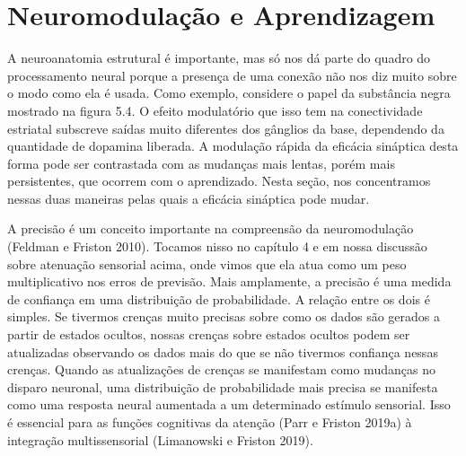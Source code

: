 \documentclass[
  12pt,
]{book}
\begin{document}
\hypertarget{neuromodulauxe7uxe3o-e-aprendizagem}{%
\section{Neuromodulação e Aprendizagem}\label{neuromodulauxe7uxe3o-e-aprendizagem}}

A neuroanatomia estrutural é importante, mas só nos dá parte do quadro do processamento neural porque a presença de uma conexão não nos diz muito sobre o modo como ela é usada. Como exemplo, considere o papel da substância negra mostrado na figura 5.4. O efeito modulatório que isso tem na conectividade estriatal subscreve saídas muito diferentes dos gânglios da base, dependendo da quantidade de dopamina liberada. A modulação rápida da eficácia sináptica desta forma pode ser contrastada com as mudanças mais lentas, porém mais persistentes, que ocorrem com o aprendizado. Nesta seção, nos concentramos nessas duas maneiras pelas quais a eficácia sináptica pode mudar.

A precisão é um conceito importante na compreensão da neuromodulação (Feldman e Friston 2010). Tocamos nisso no capítulo 4 e em nossa discussão sobre atenuação sensorial acima, onde vimos que ela atua como um peso multiplicativo nos erros de previsão. Mais amplamente, a precisão é uma medida de confiança em uma distribuição de probabilidade. A relação entre os dois é simples. Se tivermos crenças muito precisas sobre como os dados são gerados a partir de estados ocultos, nossas crenças sobre estados ocultos podem ser atualizadas observando os dados mais do que se não tivermos confiança nessas crenças. Quando as atualizações de crenças se manifestam como mudanças no disparo neuronal, uma distribuição de probabilidade mais precisa se manifesta como uma resposta neural aumentada a um determinado estímulo sensorial. Isso é essencial para as funções cognitivas da atenção (Parr e Friston 2019a) à integração multissensorial (Limanowski e Friston 2019).
\end{document}
